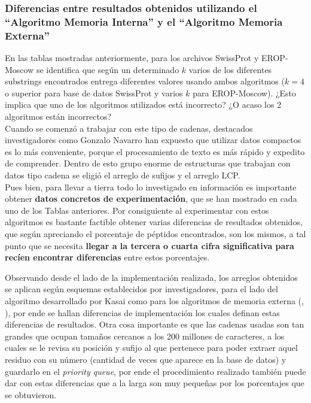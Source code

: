 \subsubsection{Diferencias entre resultados obtenidos utilizando el ``Algoritmo Memoria Interna'' y el ``Algoritmo Memoria Externa''}

En las tablas mostradas anteriormente, para los archivos SwissProt y EROP-Moscow se identifica que según un determinado $k$ varios de los diferentes substrings encontrados entrega diferentes valores usando ambos algoritmos ($k=4$ o superior para base de datos SwissProt y varios $k$ para EROP-Moscow). ¿Esto implica que uno de los algoritmos utilizados está incorrecto? ¿O acaso los 2 algoritmos están incorrectos?\\
Cuando se comenzó a trabajar con este tipo de cadenas, destacados investigadores como Gonzalo Navarro \cite{navarro2016} han expuesto que utilizar datos compactos es lo más conveniente, porque el procesamiento de texto es más rápido y expedito de comprender. Dentro de esto grupo enorme de estructuras que trabajan con datos tipo cadena se eligió el arreglo de sufijos y el arreglo LCP.\\
Pues bien, para llevar a tierra todo lo investigado en información es importante obtener \textbf{datos concretos de experimentación}, que se han mostrado en cada uno de los Tablas anteriores. Por consiguiente al experimentar con estos algoritmos es bastante factible obtener varias diferencias de resultados obtenidos, que según apreciando el porcentaje de péptidos encontrados, son los mismos, a tal punto que se necesita \textbf{llegar a la tercera o cuarta cifra significativa para recíen encontrar diferencias} entre estos porcentajes.

Observando desde el lado de la implementación realizada, los arreglos obtenidos se aplican según esquemas establecidos por investigadores, para el lado del algoritmo desarrollado por Kasai \cite{kasai} como para los algoritmos de memoria externa (\cite{sascan}, \cite{emsparse}), por ende se hallan diferencias de implementación los cuales definan estas diferencias de resultados. Otra cosa importante es que las cadenas usadas son tan grandes que ocupan tamaños cercanos a los 200 millones de caracteres, a los cuales se le revisa su posición y sufijo al que pertenece para poder extraer aquel residuo con su número (cantidad de veces que aparece en la base de datos) y guardarlo en el \textit{priority queue}, por ende el procedimiento realizado también puede dar con estas diferencias que a la larga son muy pequeñas por los porcentajes que se obtuvieron.

